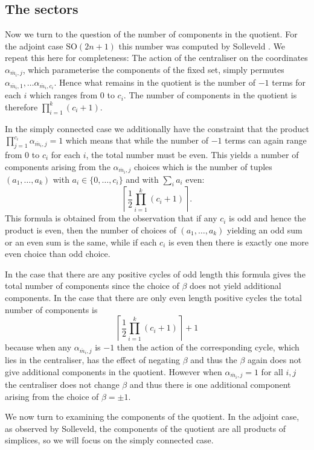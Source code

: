 \documentclass[11pt,a4paper]{article}
\def\SO{\mathrm{SO}}
\def\mbar{\overline{m}}
\def\mbar{\overline{m}}
\begin{document}
\bigskip



\subsection{The sectors}\label{B_n sectors} Now we turn to the question of the number of components in the quotient.  For the adjoint case $\SO(2n+1)$ this number was computed by Solleveld \cite{Sol}. We repeat this here for completeness:  The action of the centraliser on the coordinates $\alpha_{\mbar_i,j}$, which parameterise the components of the fixed set, simply permutes $\alpha_{\mbar_i,1},\dots \alpha_{\mbar_i,c_i}$.  Hence what remains in the quotient is the number of $-1$ terms for each $i$ which ranges from $0$ to $c_i$.  The number of components in the quotient is therefore $\prod_{i=1}^k(c_i+1)$.

In the simply connected case we additionally have the constraint that the product $\prod_{j=1}^{c_i}\alpha_{\mbar_i,j}=1$ which means that while the number of $-1$ terms can again range from $0$ to $c_i$ for each $i$, the total number must be even. This yields a number of components arising from the $\alpha_{\mbar_i,j}$ choices which is the number of tuples $(a_1,\dots,a_k)$ with $a_i\in \{0,\dots,c_i\}$ and with $\sum_{i} a_i$ even:
\[
\left\lceil \frac 12 \prod_{i=1}^k (c_i+1)\right\rceil.
\]
This formula is obtained from the observation that if any $c_i$ is odd and hence the product is even, then the number of choices of $(a_1,\dots,a_k)$ yielding an odd sum or an even sum is the same, while if each $c_i$ is even then there is exactly one more even choice than odd choice.

In the case that there are any positive cycles of odd length this formula gives the total number of components since the choice of $\beta$ does not yield additional components.  In the case that there are only even length positive cycles the total number of components is
\[
\left\lceil \frac 12 \prod_{i=1}^k (c_i+1)\right\rceil+1
\]
because when any $\alpha_{\mbar_i,j}$ is $-1$ then the action of the corresponding cycle, which lies in the centraliser, has the effect of negating $\beta$ and thus the $\beta$ again does not give additional components in the quotient.  However when $\alpha_{\mbar_i,j}=1$ for all $i,j$ the centraliser does not change $\beta$ and thus there is one additional component arising from the choice of $\beta=\pm1$.

\bigskip

We now turn to examining the components of the quotient. In the adjoint case, as observed by Solleveld, the components of the quotient are all products of simplices, so we will focus on the simply connected case.
\end{document}
